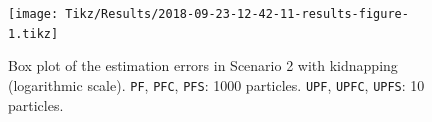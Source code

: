 %
%




\begin{figure}
	\centering
	\setlength\figureheight{0.9\textheight} 	
	\setlength{}		
	\texttt{[image: Tikz/Results/2018-09-23-12-42-11-results-figure-1.tikz]}			
	\caption[Box plot of the estimation errors in Scenario 2 with kidnapping. \texttt{PF}, \texttt{PFC}, \texttt{PFS}: 1000 particles. \texttt{UPF}, \texttt{UPFC}, \texttt{UPFS}: 10 particles.]{Box plot of the estimation errors in Scenario 2 with kidnapping (logarithmic scale). \texttt{PF}, \texttt{PFC}, \texttt{PFS}: 1000 particles. \texttt{UPF}, \texttt{UPFC}, \texttt{UPFS}: 10 particles.}
	\label{fig:2018-09-23-12-42-11-results-figure-1}			
\end{figure}

